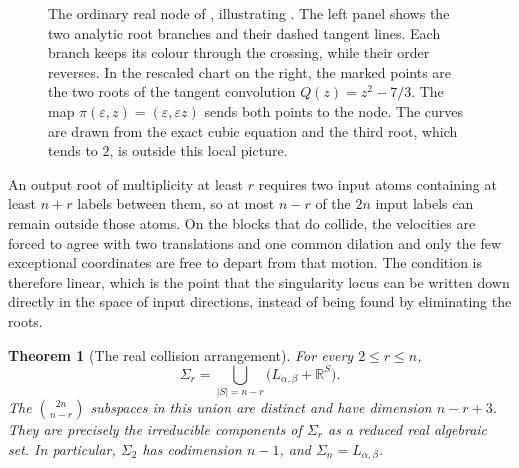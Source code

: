 \documentclass[12pt,reqno]{amsart}
\newtheorem{theorem}{Theorem}[section]
\theoremstyle{definition}
\theoremstyle{remark}
\newcommand{\R}{\mathbb R}
\newcommand{\eps}{\varepsilon}
\begin{document}
\begin{figure}[!htbp]
\caption{The ordinary real node of
, illustrating
.  The left panel shows the two
analytic root branches and their dashed tangent lines.  Each branch
keeps its colour through the crossing, while their order reverses.
In the rescaled chart on the right, the marked points are the two roots
of the tangent convolution \(Q(z)=z^2-7/3\).  The map \(\pi(\eps,z)=(\eps,\eps z)\) sends both points to the node. The curves are drawn from the exact cubic equation and the third root, which tends to \(2\), is outside this local picture.}
\label{fig:ordinary-node-blowup}
\end{figure}

An output root of multiplicity at least \(r\) requires two input atoms
containing at least \(n+r\) labels between them, so at most \(n-r\) of the
\(2n\) input labels can remain outside those atoms. On the blocks that do
collide, the velocities are forced to agree with two translations and one
common dilation and only the few exceptional coordinates are free to depart from that motion. The condition is therefore linear, which is the point that the singularity locus can be written down directly in the space of input directions, instead of being found by eliminating the roots.

\begin{theorem}[The real collision arrangement]
\label{thm:collision-arrangement}
For every \(2\leq r\leq n\),
\begin{equation}\label{eq:collision-arrangement}
 \Sigma_r=
 \bigcup_{|S|=n-r}\bigl(L_{\alpha,\beta}+\R^S\bigr).
\end{equation}
The \(\binom{2n}{n-r}\) subspaces in this union are distinct and have
dimension \(n-r+3\).  They are precisely the irreducible components of
\(\Sigma_r\) as a reduced real algebraic set.  In particular,
\(\Sigma_2\) has codimension \(n-1\), and
\(\Sigma_n=L_{\alpha,\beta}\).
\end{theorem}
\end{document}
